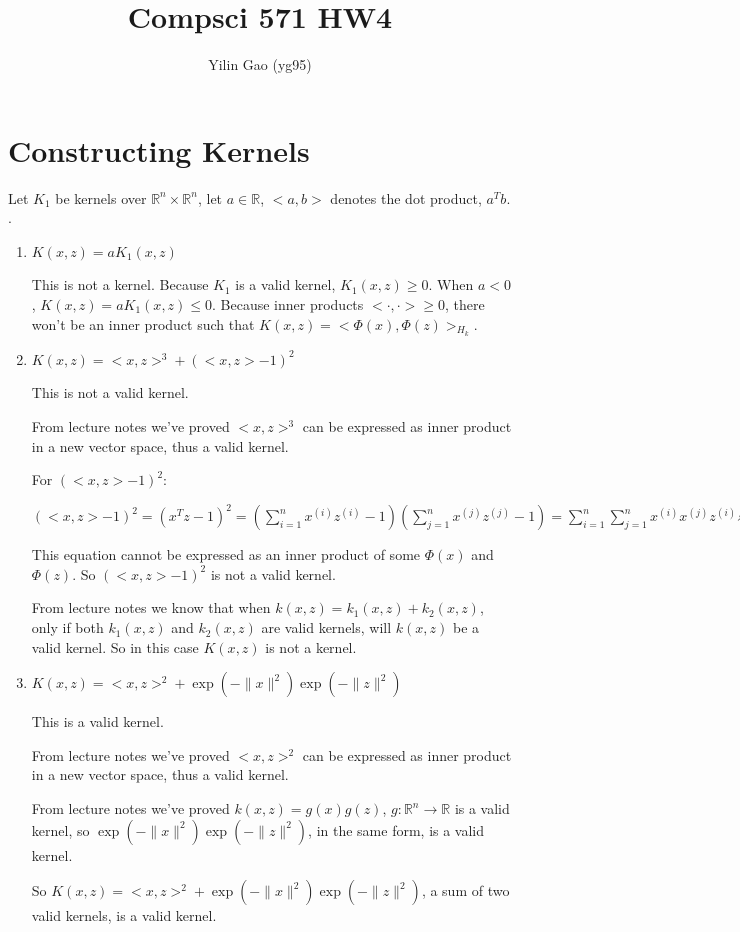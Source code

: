 \documentclass[paper=letter, fontsize=12pt]{article}
\title{Compsci 571 HW4}
\author{Yilin Gao (yg95)}
\begin{document}
\maketitle
\section{Constructing Kernels}
Let $K_1$ be kernels over $\mathbb{R}^n\times\mathbb{R}^n$, let $a \in \mathbb{R}$, $<a,b>$ denotes the dot product, $a^Tb$. .

\begin{enumerate}[label=(\alph*)]
	\item $K(x,z)=aK_1(x,z)$
	
	This is not a kernel. Because $K_1$ is a valid kernel, $K_1(x, z) \geq 0$. When $a < 0$, $K(x,z)=aK_1(x,z) \leq 0$. Because inner products $<\cdot, \cdot> \geq 0$, there won't be an inner product such that $K(x, z) = <\Phi(x), \Phi(z)>_{H_k}$.
	
	\item $K(x,z)=<x,z>^3+(<x,z>-1)^2$
	
	This is not a valid kernel. 
	
	From lecture notes we've proved $<x,z>^3$ can be expressed as inner product in a new vector space, thus a valid kernel. 
	
	For $(<x,z>-1)^2$:
	
	$(<x,z>-1)^2 = (x^T z - 1)^2 = (\sum_{i = 1}^{n} x^{(i)} z^{(i)} - 1) (\sum_{j = 1}^{n} x^{(j)} z^{(j)} - 1) = \sum_{i = 1}^{n}\sum_{j = 1}^{n} x^{(i)} x^{(j)} z^{(i)} z^{(j)} - 2 \sum_{i = 1}^{n}x^{(i)} z^{(i)} + 1 = \sum_{i = 1}^{n}\sum_{j = 1}^{n} x^{(i)} x^{(j)} z^{(i)} z^{(j)} -  \sum_{i = 1}^{n} (\sqrt{2}x^{(i)})  (\sqrt{2} z^{(i)}) + 1$
	
	This equation cannot be expressed as an inner product of some $\Phi(x)$ and $\Phi(z)$. So $(<x,z>-1)^2$ is not a valid kernel.
	
	From lecture notes we know that when $k(x, z) = k_1(x, z) + k_2(x, z)$, only if both $k_1(x, z)$ and $k_2(x, z)$ are valid kernels, will $k(x, z)$ be a valid kernel. So in this case $K(x, z)$ is not a kernel.
	
	\item $K(x,z)=<x,z>^2+\exp(-\|x\|^2)\exp(-\|z\|^2)$
	
	This is a valid kernel.
	
	From lecture notes we've proved $<x,z>^2$ can be expressed as inner product in a new vector space, thus a valid kernel. 
	
	From lecture notes we've proved $k(x, z) = g(x)g(z)$, $g: \mathbb{R}^n \rightarrow \mathbb{R}$ is a valid kernel, so $\exp(-\|x\|^2)\exp(-\|z\|^2)$, in the same form, is a valid kernel.
	
	So $K(x,z)=<x,z>^2+\exp(-\|x\|^2)\exp(-\|z\|^2)$, a sum of two valid kernels, is  a valid kernel.
	 
\end{enumerate}
\end{document}
